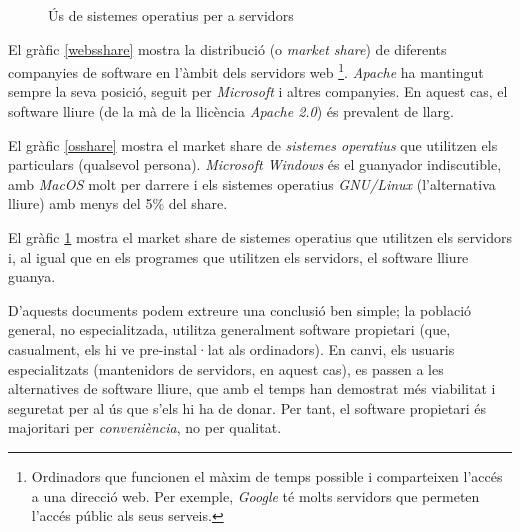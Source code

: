 	\begin{figure}[h!]
	\centering
	\caption{Ús de sistemes operatius per a servidors \cite{ossvstats}}
	\label{ossvshare}
	\end{figure}

	El gràfic \ref{websshare} mostra la distribució (o \emph{market share}) de diferents companyies de software
	en l'àmbit dels servidors web
	\footnote{Ordinadors que funcionen el màxim de temps possible i comparteixen l'accés a una direcció web.
	Per exemple, \emph{Google} té molts servidors que permeten l'accés públic als seus serveis.}.
	\emph{Apache}\cite{apache} ha mantingut sempre la seva posició,
	seguit per \emph{Microsoft} i altres companyies. En aquest cas, el software lliure (de la mà de la
	llicència \emph{Apache 2.0}\cite{apachelicense}) és prevalent de llarg.

	El gràfic \ref{osshare} mostra el market share de \emph{sistemes operatius} que utilitzen els particulars
	(qualsevol persona). \emph{Microsoft Windows} és el guanyador indiscutible, amb \emph{MacOS} molt per darrere
	i els sistemes operatius \emph{GNU/Linux} (l'alternativa lliure) amb menys del 5\% del share.

	El gràfic \ref{ossvshare} mostra el market share de sistemes operatius que utilitzen els servidors i,
	al igual que en els programes que utilitzen els servidors, el software lliure guanya.
	
	D'aquests documents podem extreure una conclusió ben simple; la població general, no especialitzada,
	utilitza generalment software propietari (que, casualment, els hi ve pre-instal·lat als ordinadors).
	En canvi, els usuaris especialitzats (mantenidors de servidors, en aquest cas), es passen a les alternatives
	de software lliure, que amb el temps han demostrat més viabilitat i seguretat per al ús que s'els hi ha de donar.
	Per tant, el software propietari és majoritari per \emph{conveniència}, no per qualitat.


